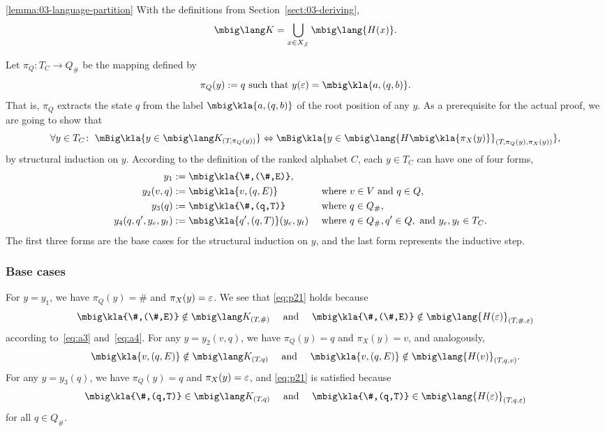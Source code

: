 \begin{repeatlemma}{\ref{lemma:03-language-partition}}
 With the definitions from Section~\ref{sect:03-deriving},
 \[
  \mbig\lang K = \bigcup_{x\in X_{\not\bot}} \mbig\lang{H(x)}.
 \]
\end{repeatlemma}

Let $\pi_Q: T_C\to Q_\#$ be the mapping defined by
\[
 \pi_Q(y) := q \text{ such that } y(\eps) = \mbig\kla{a,(q,b)}.
\]
That is, $\pi_Q$ extracts the state $q$ from the label $\mbig\kla{a,(q,b)}$
of the root position of any $y$. As a prerequisite for the actual proof, we are
going to show that
\begin{equation}\label{eq:p21}
 \forall y\in T_C\colon\;
 \mBig\kla{y\in\mbig\lang K_{(T\!,\pi_Q(y))}}
 \Leftrightarrow
 \mBig\kla{y\in\mbig\lang{H\mbig\kla{\pi_X(y)}}_{(T\!,\pi_Q(y),\pi_X(y))}},
\end{equation}
by structural induction on $y$. According to the definition of the ranked
alphabet $C$, each $y\in T_C$ can have one of four forms,
\begin{align*}
 y_1 &:= \mbig\kla{\#,(\#,E)}, \\
 y_2(v,q) &:= \mbig\kla{v,(q,E)} &&\text{ where } v\in V\text{ and } q\in Q, \\
 y_3(q) &:= \mbig\kla{\#,(q,T)} &&\text{ where } q\in Q_\#, \\
 y_4(q,q',y_e,y_t) &:= \mbig\kla{q',(q,T)}(y_e,y_t) &&\text{ where } q\in Q_\#, q'\in Q, \text{ and } y_e,y_t\in T_C.
\end{align*}
The first three forms are the base cases for the structural induction on $y$,
and the last form represents the inductive step.

\subsubsection*{Base cases}

For $y=y_1$, we have $\pi_Q(y) = \#$ and $\pi_X(y) = \varepsilon$. We see that \eqref{eq:p21} holds
because
\[
 \mbig\kla{\#,(\#,E)} \notin \mbig\lang K_{(T\!,\#)}
 \quad\text{ and }\quad
 \mbig\kla{\#,(\#,E)} \notin \mbig\lang{H(\eps)}_{(T\!,\#,\eps)}
\]
according to~\eqref{eq:a3} and~\eqref{eq:a4}. For any $y=y_2(v,q)$, we have
$\pi_Q(y)=q$ and $\pi_X(y)=v$, and analogously,
\[
 \mbig\kla{v,(q,E)} \notin \mbig\lang K_{(T\!,q)}
 \quad\text{ and }\quad
 \mbig\kla{v,(q,E)} \notin \mbig\lang{H(v)}_{(T\!,q,v)}.
\]
For any $y=y_3(q)$, we have $\pi_Q(y) = q$ and $\pi_X(y)=\varepsilon$, and \eqref{eq:p21} is
satisfied because
\[
 \mbig\kla{\#,(q,T)} \in \mbig\lang K_{(T\!,q)}
 \quad\text{ and }\quad
 \mbig\kla{\#,(q,T)} \in \mbig\lang{H(\eps)}_{(T\!,q,\eps)}
\]
for all $q\in Q_\#$.

